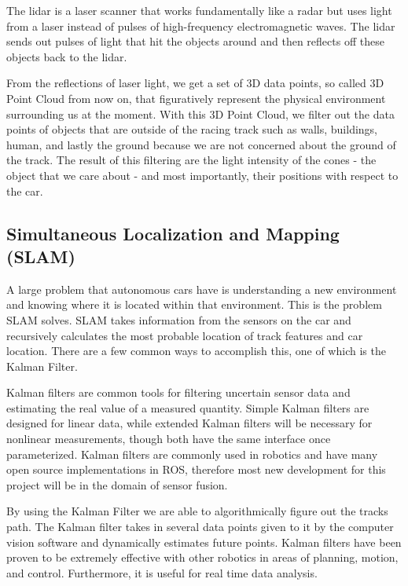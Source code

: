 \documentclass[10pt, onecolumn, draftclsnofoot, letterpaper,compsoc]{IEEEtran}
\begin{document}
The lidar is a laser scanner that works fundamentally like a radar but uses light from a laser instead of pulses of high-frequency electromagnetic waves. The lidar sends out pulses of light that hit the objects around and then reflects off these objects back to the lidar.

From the reflections of laser light, we get a set of 3D data points, so called 3D Point Cloud from now on, that figuratively represent the physical environment surrounding us at the moment. With this 3D Point Cloud, we filter out the data points of objects that are outside of the racing track such as walls, buildings, human, and lastly the ground because we are not concerned about the ground of the track. The result of this filtering are the light intensity of the cones - the object that we care about - and most importantly, their positions with respect to the car.

\subsection{Simultaneous Localization and Mapping (SLAM)}
A large problem that autonomous cars have is understanding a new environment and knowing where it is located within that environment. This is the problem SLAM solves. SLAM takes information from the sensors on the car and recursively calculates the most probable location of track features and car location. There are a few common ways to accomplish this, one of which is the Kalman Filter.

Kalman filters are common tools for filtering uncertain sensor data and estimating the real value of a measured quantity. Simple Kalman filters are designed for linear data, while extended Kalman filters will be necessary for nonlinear measurements, though both have the same interface once parameterized. Kalman filters are commonly used in robotics and have many open source implementations in ROS, therefore most new development for this project will be in the domain of sensor fusion. 

By using the Kalman Filter we are able to algorithmically figure out the tracks path. The Kalman filter takes in several data points given to it by the computer vision software and dynamically estimates future points. Kalman filters have been proven to be extremely effective with other robotics in areas of planning, motion, and control. Furthermore, it is useful for real time data analysis. 
\end{document}
